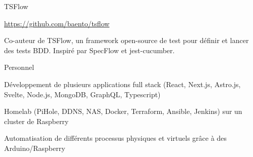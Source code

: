 
\begin{cventries}
  \cventrywithouttitleanddate
    {TSFlow} %
    {} %
    {
      \begin{cvitems} %
        \item {\href{https://github.com/baento/tsflow}{https://github.com/baento/tsflow}}
        \item {Co-auteur de TSFlow, un framework open-source de test pour définir et lancer des tests BDD. Inspiré par SpecFlow et jest-cucumber.}
      \end{cvitems}
    }

  \cventry
    {} %
    {Personnel} %
    {} %
    {} %
    {
      \begin{cvitems} %
        \item {Développement de plusieurs applications full stack (React, Next.js, Astro.js, Svelte, Node.js, MongoDB, GraphQL, Typescript)}
        \item {Homelab (PiHole, DDNS, NAS, Docker, Terraform, Ansible, Jenkins) sur un cluster de Raspberry}
        \item {Automatisation de différents processus physiques et virtuels grâce à des Arduino/Raspberry}
      \end{cvitems}
    }

\end{cventries}